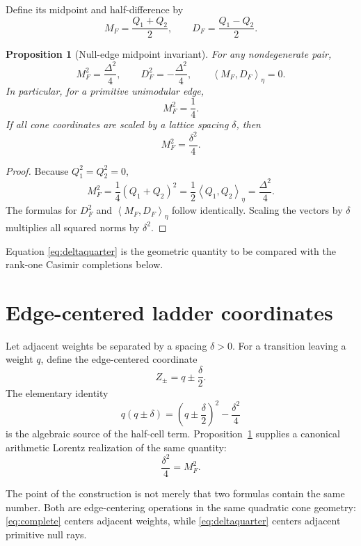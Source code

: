 \documentclass[11pt]{article}
\newtheorem{proposition}[theorem]{Proposition}
\theoremstyle{remark}
\newcommand{\ip}[2]{\left\langle #1,#2\right\rangle_\eta}
\begin{document}
Define its midpoint and half-difference by
\[
M_F=\frac{Q_1+Q_2}{2},
\qquad
D_F=\frac{Q_1-Q_2}{2}.
\]

\begin{proposition}[Null-edge midpoint invariant]
\label{prop:midpoint}
For any nondegenerate pair,
\[
M_F^2=\frac{\Delta^2}{4},
\qquad
D_F^2=-\frac{\Delta^2}{4},
\qquad
\ip{M_F}{D_F}=0.
\]
In particular, for a primitive unimodular edge,
\begin{equation}
\boxed{
M_F^2=\frac14.
}
\label{eq:quarter}
\end{equation}
If all cone coordinates are scaled by a lattice spacing $\delta$, then
\begin{equation}
\boxed{
M_F^2=\frac{\delta^2}{4}.
}
\label{eq:deltaquarter}
\end{equation}
\end{proposition}

\begin{proof}
Because $Q_1^2=Q_2^2=0$,
\[
M_F^2
=
\frac14(Q_1+Q_2)^2
=
\frac12\ip{Q_1}{Q_2}
=
\frac{\Delta^2}{4}.
\]
The formulas for $D_F^2$ and $\ip{M_F}{D_F}$ follow identically.  Scaling the vectors by $\delta$ multiplies all squared norms by $\delta^2$.
\end{proof}

Equation \eqref{eq:deltaquarter} is the geometric quantity to be compared with the rank-one Casimir completions below.

\section{Edge-centered ladder coordinates}

Let adjacent weights be separated by a spacing $\delta>0$.  For a transition leaving a weight $q$, define the edge-centered coordinate
\begin{equation}
\boxed{
Z_\pm=q\pm\frac{\delta}{2}.
}
\label{eq:Zedge}
\end{equation}
The elementary identity
\begin{equation}
q(q\pm\delta)
=
\left(q\pm\frac{\delta}{2}\right)^2-\frac{\delta^2}{4}
\label{eq:complete}
\end{equation}
is the algebraic source of the half-cell term.  Proposition~\ref{prop:midpoint} supplies a canonical arithmetic Lorentz realization of the same quantity:
\[
\frac{\delta^2}{4}=M_F^2.
\]

The point of the construction is not merely that two formulas contain the same number.  Both are edge-centering operations in the same quadratic cone geometry: \eqref{eq:complete} centers adjacent weights, while \eqref{eq:deltaquarter} centers adjacent primitive null rays.
\end{document}
